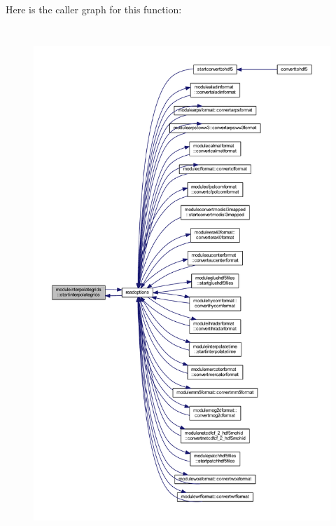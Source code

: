 Here is the caller graph for this function\+:\nopagebreak
\begin{figure}[H]
\begin{center}
\leavevmode
\includegraphics[height=550pt]{namespacemoduleinterpolategrids_af563db97a33c679a4f2a61c77a82a50f_icgraph}
\end{center}
\end{figure}
\mbox{\label{namespacemoduleinterpolategrids_aab05b158a6c1a5ca9b834b44a96bed51}} 
